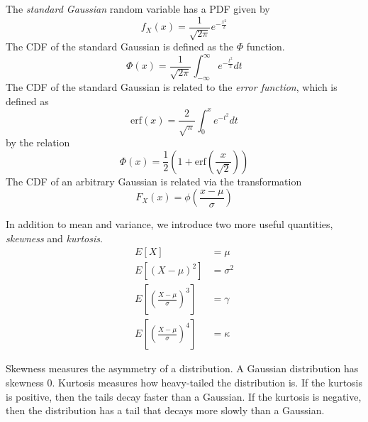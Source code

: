 The \emph{standard Gaussian} random variable has a
PDF given by
\begin{equation}
    f_X(x) = \frac{1}{\sqrt{2\pi}} e^{-\frac{x^2}{2}}
\end{equation}
The CDF of the standard Gaussian is defined
as the $\Phi$ function.
\begin{equation}
    \Phi(x) = \frac{1}{\sqrt{2\pi}}\int_{-\infty}^{\infty} e^{-\frac{t^2}{2}}dt
\end{equation}
The CDF of the standard Gaussian is related to the
\emph{error function}, which is defined as
\begin{equation}
    \text{erf}(x) = \frac{2}{\sqrt{\pi}} \int_{0}^{x} e^{-t^2} dt
\end{equation}
by the relation
\begin{equation}
    \Phi(x) = \frac{1}{2} \left(1 + \text{erf}\left(\frac{x}{\sqrt{2}}\right)\right)
\end{equation}
The CDF of an arbitrary Gaussian is related via
the transformation
\begin{equation}
    F_X(x) = \phi\left(\frac{x - \mu}{\sigma}\right)
\end{equation}

In addition to mean and variance, we introduce
two more useful quantities, \emph{skewness} and
\emph{kurtosis}.
\begin{align}
    E\left[X\right]                                   & = \mu      \\
    E\left[(X - \mu)^2\right]                         & = \sigma^2 \\
    E\left[\left(\frac{X-\mu}{\sigma}\right)^3\right] & = \gamma   \\
    E\left[\left(\frac{X-\mu}{\sigma}\right)^4\right] & = \kappa
\end{align}

Skewness measures the asymmetry of a
distribution. A Gaussian distribution has
skewness 0. Kurtosis measures how heavy-tailed
the distribution is. If the kurtosis is
positive, then the tails decay faster than a
Gaussian. If the kurtosis is negative, then
the distribution has a tail that
decays more slowly than a Gaussian.

